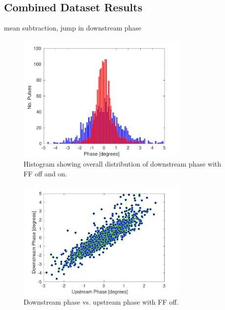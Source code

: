 \subsection{Combined Dataset Results}
\label{ss:longFF_combinedResults}

mean subtraction, jump in downstream phase

\begin{figure}
  \centering
  \includegraphics[width=0.75\textwidth]{Figures/feedforward/longFF_histDownstreamPhase}
  \caption{Histogram showing overall distribution of downstream phase with FF off and on.}
  \label{f:longFF_histDownstreamPhase}
\end{figure}

\begin{figure}
  \centering
  \includegraphics[width=0.75\textwidth]{Figures/feedforward/longFF_scatterFFOff}
  \caption{Downstream phase vs. upstream phase with FF off.}
  \label{f:longFF_scatterFFOff}
\end{figure}

